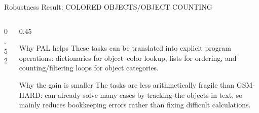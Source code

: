 \begin{frame}{Robustness Result: COLORED OBJECTS/OBJECT COUNTING}
\begin{columns}[T]
\begin{column}{0.52\linewidth}
\end{column}

\begin{column}{0.45\linewidth}


\begin{block}{Why PAL helps}
These tasks can be translated into explicit program operations:
dictionaries for object--color lookup, lists for ordering, and counting/filtering loops for object categories.
\end{block}

\begin{block}{Why the gain is smaller}
The tasks are less arithmetically fragile than GSM-HARD: \CoT{} can already solve many cases by tracking the objects in text, so \PAL{} mainly reduces bookkeeping errors rather than fixing difficult calculations.
\end{block}
\end{column}
\end{columns}


\end{frame}